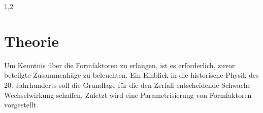 \documentclass[11pt,a4paper,twoside]{report}
\begin{document}
\begin{spacing}{1,2}

\chapter{Theorie}
Um Kenntnis über die Formfaktoren zu erlangen, ist es erforderlich, zuvor beteilgte Zusammenhäge zu beleuchten. Ein Einblick in die historische Physik
des 20. Jahrhunderts soll die Grundlage für die den Zerfall entscheidende Schwache Wechselwirkung schaffen. Zuletzt wird eine Parametrisierung von Formfaktoren
vorgestellt.


\end{spacing}
\end{document}
